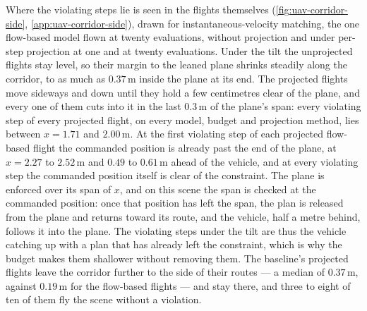 Where the violating steps lie is seen in the flights themselves (\autoref{fig:uav-corridor-side},
\autoref{app:uav-corridor-side}), drawn
for instantaneous-velocity matching, the one flow-based model flown at twenty evaluations, without
projection and under per-step projection at one and at twenty evaluations. Under the tilt the unprojected
flights stay level, so their margin to the leaned plane shrinks steadily along the corridor, to as much
as $0.37$\,m inside the plane at its end. The projected flights move sideways and down until they hold a few
centimetres clear of the plane, and every one of them cuts into it in the last $0.3$\,m of the plane's
span: every violating step of every projected flight, on every model, budget and projection method, lies
between $x=1.71$ and $2.00$\,m. At the first violating step of each projected flow-based flight the
commanded position is already past the end of the plane, at $x=2.27$ to $2.52$\,m and $0.49$ to
$0.61$\,m ahead of the vehicle, and at every violating step the commanded position itself is clear of the
constraint. The plane is enforced over its span of $x$, and on this scene the span is checked at the
commanded position: once that position has left the span, the plan is released from the plane and
returns toward its route, and the vehicle, half a metre behind, follows it into the plane. The violating
steps under the tilt are thus the vehicle catching up with a plan that has already left the constraint,
which is why the budget makes them shallower without removing them. The baseline's projected flights leave
the corridor further to the side of their routes --- a median of $0.37$\,m, against $0.19$\,m for the
flow-based flights --- and stay there, and three to eight of ten of them fly the scene without a
violation.

